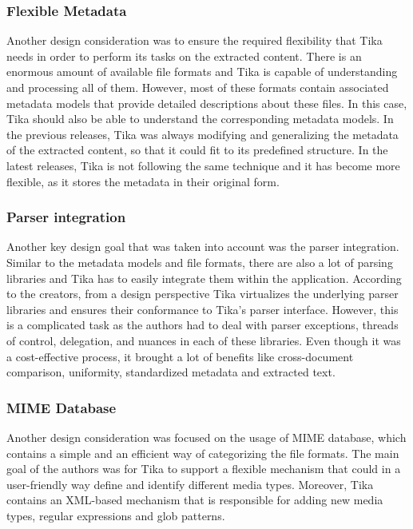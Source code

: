 \documentclass{article}
\begin{document}
\subsubsection{Flexible Metadata}
Another design consideration was to ensure the required flexibility that Tika needs in order to perform its tasks on the extracted content. There is an enormous amount of available file formats and Tika is capable of understanding and processing all of them. However, most of these formats contain associated metadata models that provide detailed descriptions about these files. In this case, Tika should also be able to understand the corresponding metadata models. In the previous releases, Tika was always modifying and generalizing the metadata of the extracted content, so that it could fit to its predefined structure. In the latest releases, Tika is not following the same technique and it has become more flexible, as it stores the metadata in their original form.

\subsubsection{Parser integration}
Another key design goal that was taken into account was the parser integration. Similar to the metadata models and file formats, there are also a lot of parsing libraries and Tika has to easily integrate them within the application. According to the creators, from a design perspective Tika virtualizes the underlying parser libraries and ensures their conformance to Tika’s parser interface. However, this is a complicated task as the authors had to deal with parser exceptions, threads of control, delegation, and nuances in each of these libraries. Even though it was a cost-effective process, it brought a lot of benefits like cross-document comparison, uniformity, standardized metadata and extracted text.

\subsubsection{MIME Database}
Another design consideration was focused on the usage of MIME database, which contains a simple and an efficient way of categorizing the file formats. The main goal of the authors was for Tika to support a flexible mechanism that could in a user-friendly way define and identify different media types. Moreover, Tika contains an XML-based mechanism that is responsible for adding new media types, regular expressions and glob patterns.
\end{document}
